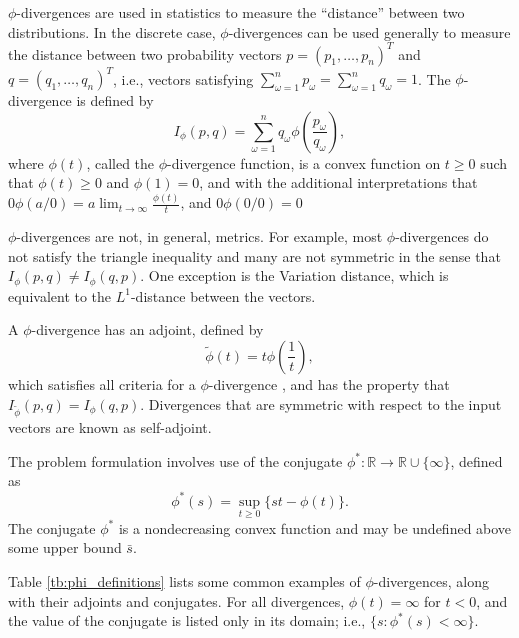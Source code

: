 \documentclass[opre,nonblindrev]{informs3} %
\newcommand{\R}{{\mathbb{R}}}
\begin{document}
$\phi$-divergences are used in statistics to measure the ``distance'' between two distributions. 
In the discrete case, $\phi$-divergences can be used generally to measure the distance between two probability vectors $p = (p_1, \dots, p_n)^T$ and $q = (q_1, \dots, q_n)^T$, i.e., vectors satisfying $\sum_{\omega=1}^n p_\omega = \sum_{\omega=1}^n q_\omega = 1$.
The $\phi$-divergence is defined by
\[
	I_\phi(p,q) = \sum_{\omega=1}^n q_\omega \phi\left(\frac{p_\omega}{q_\omega}\right),
\]
where $\phi(t)$, called the $\phi$-divergence function, is a convex function on $t \geq 0$ such that $\phi(t) \geq 0$ and $\phi(1) = 0$, and with the additional interpretations that $0 \phi(a/0) = a \lim_{t \rightarrow \infty} \frac{\phi(t)}{t}$, and $0 \phi(0/0) = 0$

$\phi$-divergences are not, in general, metrics.
For example, most $\phi$-divergences do not satisfy the triangle inequality and many are not symmetric in the sense that $I_\phi(p,q) \neq I_\phi(q,p)$.
One exception is the Variation distance, which is equivalent to the $L^1$-distance between the vectors.

A $\phi$-divergence has an adjoint, defined by
\begin{equation} \label{eq:adjoint}
	\tilde{\phi}(t) = t \phi\left(\frac{1}{t}\right),
\end{equation}
which satisfies all criteria for a $\phi$-divergence \citep{bental1991certainty}, and has the property that $I_{\tilde{\phi}}(p,q) = I_\phi(q,p)$.
Divergences that are symmetric with respect to the input vectors are known as self-adjoint.

The problem formulation involves use of the conjugate $\phi^* : \R \rightarrow \R \cup \{\infty\}$, defined as
\begin{equation} \label{eq:conjugate}
	\phi^*(s) = \sup_{t \geq 0} \{st - \phi(t)\}.
\end{equation}
The conjugate $\phi^*$ is a nondecreasing convex function and may be undefined above some upper bound $\bar{s}$.

Table \ref{tb:phi_definitions} lists some common examples of $\phi$-divergences, along with their adjoints and conjugates.
For all divergences, $\phi(t) = \infty$ for $t < 0$, and the value of the conjugate is listed only in its domain; i.e., $\{s : \phi^*(s) < \infty\}$.
\end{document}
